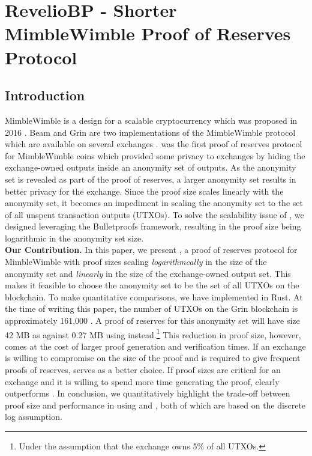 \chapter{\textnormal{{\selectfont RevelioBP}} - Shorter MimbleWimble Proof of Reserves Protocol}
\label{chap:revBP}

\section{Introduction}

MimbleWimble is a design for a scalable cryptocurrency which was proposed in 2016 \cite{Jedusor2016}. Beam and Grin are two implementations of the MimbleWimble protocol which are available on several exchanges \cite{Coinmarketcap}. \R \cite{Dutta2019b} was the first proof of reserves protocol for MimbleWimble coins which provided some privacy to exchanges by hiding the exchange-owned outputs inside an anonymity set of outputs. As the anonymity set is revealed as part of the proof of reserves, a larger anonymity set results in better privacy for the exchange. Since the \R proof size scales linearly with the anonymity set, it becomes an impediment in scaling the anonymity set to the set of all unspent transaction outputs (UTXOs).
To solve the scalability issue of \Rw, we designed \RB leveraging the Bulletproofs \cite{Bunz2018} framework, resulting in the proof size being logarithmic in the anonymity set size.\\[-6pt]   

\noindent \textbf{Our Contribution.} In this paper, we present \Rplus, a proof of reserves protocol for MimbleWimble with proof sizes scaling \textit{logarithmcally} in the size of the anonymity set and \textit{linearly} in the size of the exchange-owned output set.
This makes it feasible to choose the anonymity set to be the set of all UTXOs on the blockchain.  
To make quantitative comparisons, we have implemented \RB  in Rust.
At the time of writing this paper, the number of UTXOs on the Grin blockchain is approximately 161,000 \cite{GrinScanWebsite}.
A \R proof of reserves for this anonymity set will have size 42 MB as against 0.27 MB using \RPlus instead.\footnote{Under the assumption that the exchange owns 5\% of all UTXOs.}
This reduction in proof size, however, comes at the cost of larger proof generation and verification times. If an exchange is willing to compromise on the size of the proof and is required to give frequent proofs of reserves,
\R serves as a better choice. If proof sizes are critical for an exchange and it is willing to spend more time generating the proof, \RB clearly outperforms \Rw.   
In conclusion, we quantitatively highlight the trade-off between proof size and performance in using \R and \RBw, both of which are based on the discrete log assumption.

